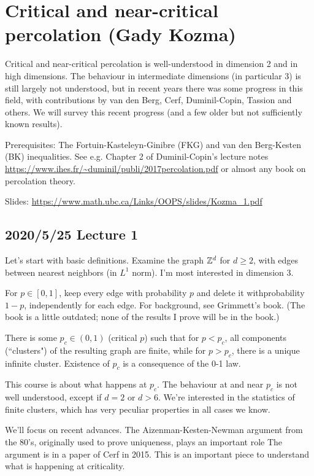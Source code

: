 
\section{Critical and near-critical percolation (Gady Kozma)}

Critical and near-critical percolation is well-understood in dimension 2 and in high dimensions. The behaviour in intermediate dimensions (in particular 3) is still largely not understood, but in recent years there was some progress in this field, with contributions by van den Berg, Cerf, Duminil-Copin, Tassion and others. We will survey this recent progress (and a few older but not sufficiently known results).

Prerequisites: The Fortuin-Kasteleyn-Ginibre (FKG) and van den Berg-Kesten (BK) inequalities. See e.g. Chapter 2 of Duminil-Copin's lecture notes \url{https://www.ihes.fr/~duminil/publi/2017percolation.pdf} or almost any book on percolation theory. 

Slides: \url{https://www.math.ubc.ca/Links/OOPS/slides/Kozma_1.pdf}

\subsection*{2020/5/25 Lecture 1}

Let's start with basic definitions. Examine the graph $\mathbb{Z}^d$ for $d\ge 2$, with edges between nearest neighbors (in $L^1$ norm). I'm most interested in dimension 3.

For $p\in [0,1]$, keep every edge with probability $p$ and delete it withprobability $1-p$, independently for each edge. For background, see Grimmett's book. (The book is a little outdated; none of the results I prove will be in the book.)

There is some $p_c\in (0,1)$ (critical $p$) such that for $p<p_c$, all components (``clusters") of the resulting graph are finite, while for $p>p_c$, there is a unique infinite cluster. 
Existence of $p_c$ is a consequence of the 0-1 law.

This course is about what happens at $p_c$. The behaviour at and near $p_c$ is not well understood, except if $d=2$ or $d>6$. We're interested in the statistics of finite clusters, which has very peculiar properties in all cases we know.

We'll focus on recent advances. The Aizenman-Kesten-Newman argument from the 80's, originally used to prove uniqueness, plays an important role The argument is in a paper of Cerf in 2015. This is an important piece to understand what is happening at criticality.

